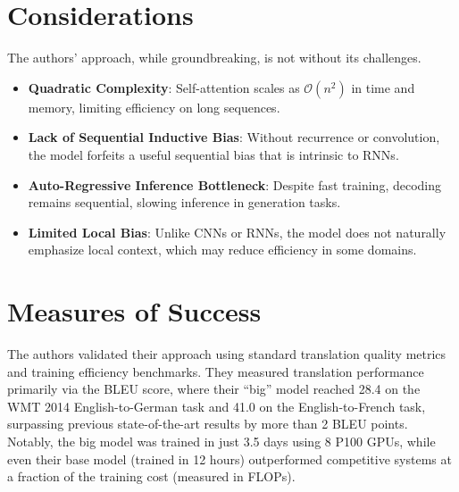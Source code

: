 \documentclass[10pt]{article}
\begin{document}
\section*{Considerations}
The authors' approach, while groundbreaking, is not without its challenges.
\begin{itemize}
    \item \textbf{Quadratic Complexity}: Self-attention scales as $\mathcal{O}(n^2)$ in time and memory, limiting efficiency on long sequences.
    \item \textbf{Lack of Sequential Inductive Bias}: Without recurrence or convolution, the model forfeits a useful sequential bias that is intrinsic to RNNs.
    \item \textbf{Auto-Regressive Inference Bottleneck}: Despite fast training, decoding remains sequential, slowing inference in generation tasks.
    \item \textbf{Limited Local Bias}: Unlike CNNs or RNNs, the model does not naturally emphasize local context, which may reduce efficiency in some domains.
\end{itemize}

\section*{Measures of Success}
The authors validated their approach using standard translation quality metrics and training efficiency benchmarks. They measured translation performance primarily via the BLEU score, where their ``big'' model reached 28.4 on the WMT 2014 English-to-German task and 41.0 on the English-to-French task, surpassing previous state-of-the-art results by more than 2 BLEU points. Notably, the big model was trained in just 3.5 days using 8 P100 GPUs, while even their base model (trained in 12 hours) outperformed competitive systems at a fraction of the training cost (measured in FLOPs).
\end{document}
